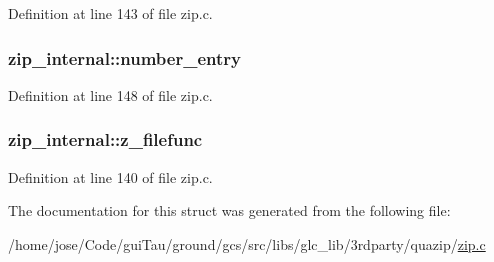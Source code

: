 Definition at line 143 of file zip.\-c.

\hypertarget{structzip__internal_a8415937c4a5b2afc0adde407d59f2750}{
\subsubsection[{number\-\_\-entry}]{ zip\-\_\-internal\-::number\-\_\-entry}}\label{structzip__internal_a8415937c4a5b2afc0adde407d59f2750}


Definition at line 148 of file zip.\-c.

\hypertarget{structzip__internal_a52b481ed001fdb87cc389c128b8c0f6e}{
\subsubsection[{z\-\_\-filefunc}]{ zip\-\_\-internal\-::z\-\_\-filefunc}}\label{structzip__internal_a52b481ed001fdb87cc389c128b8c0f6e}


Definition at line 140 of file zip.\-c.



The documentation for this struct was generated from the following file\-:\begin{DoxyCompactItemize}
\item 
/home/jose/\-Code/gui\-Tau/ground/gcs/src/libs/glc\-\_\-lib/3rdparty/quazip/\hyperlink{zip_8c}{zip.\-c}\end{DoxyCompactItemize}
